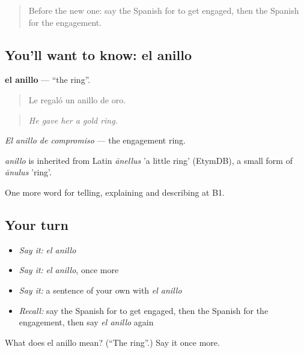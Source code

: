 \label{lesson:ES-C547-anillo}



\begin{quote}
Before the new one: say the Spanish for to get engaged, then the Spanish for the engagement.
\end{quote}

\subsection*{You'll want to know: el anillo}
\textbf{el anillo} — \textquotedblleft{}the ring\textquotedblright{}.

\begin{quote}
Le regaló un anillo de oro.
\end{quote}

\begin{quote}
\emph{He gave her a gold ring.}
\end{quote}

\emph{El anillo de compromiso} — the engagement ring.

\begin{cousinweb}
\emph{anillo} is inherited from Latin \emph{ānellus} 'a little ring' (EtymDB), a small form of \emph{ānulus} 'ring'.
\end{cousinweb}

\begin{grammarlens}[title={What you've built}]
One more word for telling, explaining and describing at B1.
\end{grammarlens}

\subsection*{Your turn}
\begin{itemize}
\raggedright
  \item \emph{Say it:} \emph{el anillo}
  \item \emph{Say it:} \emph{el anillo}, once more
  \item \emph{Say it:} a sentence of your own with \emph{el anillo}
  \item \emph{Recall:} say the Spanish for to get engaged, then the Spanish for the engagement, then say \emph{el anillo} again
\end{itemize}

\begin{tcolorbox}[breakable,colback=teal!4,colframe=teal!35!black,title={Before you move on}]
What does el anillo mean? (\textquotedblleft{}The ring\textquotedblright{}.) Say it once more.
\end{tcolorbox}
